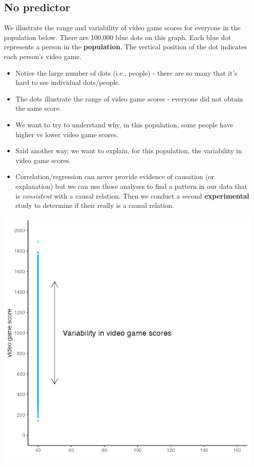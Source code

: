 \documentclass[
]{krantz}
\begin{document}
\hypertarget{no-predictor}{%
\subsection{No predictor}\label{no-predictor}}

We illustrate the range and variability of video game scores for everyone in the population below. There are 100,000 blue dots on this graph. Each blue dot represents a person in the \textbf{population}. The vertical position of the dot indicates each person's video game.

\begin{itemize}
\item
  Notice the large number of dots (i.e., people) - there are so many that it's hard to see individual dots/people.
\item
  The dots illustrate the range of video game scores - everyone did not obtain the same score.
\item
  We want to try to understand why, in this population, some people have higher vs lower video game scores.
\item
  Said another way, we want to explain, for this population, the variability in video game scores.
\item
  Correlation/regression can never provide evidence of causation (or explanation) but we can use those analyses to find a pattern in our data that is \emph{consistent} with a causal relation. Then we conduct a second \textbf{experimental} study to determine if their really is a causal relation.
\end{itemize}

\includegraphics[width=0.7\linewidth]{ch_correlation/images/pop_graph_arrow}
\end{document}
